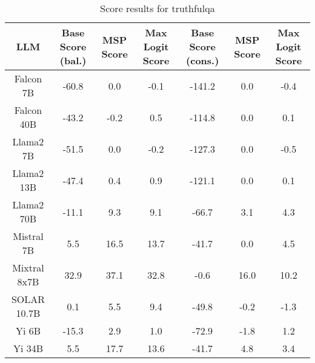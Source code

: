 \renewcommand\arraystretch{1.2}
\begin{table*}
\centering
\begin{tabular}{c|c|c|c|c|c|c}
LLM & Base Score (bal.) & MSP Score & Max Logit Score & Base Score (cons.) & MSP Score & Max Logit Score\\ \hline
Falcon 7B & -60.8 & 0.0 & -0.1 & -141.2 & 0.0 & -0.4\\
Falcon 40B & -43.2 & -0.2 & 0.5 & -114.8 & 0.0 & 0.1\\
Llama2 7B & -51.5 & 0.0 & -0.2 & -127.3 & 0.0 & -0.5\\
Llama2 13B & -47.4 & 0.4 & 0.9 & -121.1 & 0.0 & 0.1\\
Llama2 70B & -11.1 & 9.3 & 9.1 & -66.7 & 3.1 & 4.3\\
Mistral 7B & 5.5 & 16.5 & 13.7 & -41.7 & 0.0 & 4.5\\
Mixtral 8x7B & 32.9 & 37.1 & 32.8 & -0.6 & 16.0 & 10.2\\
SOLAR 10.7B & 0.1 & 5.5 & 9.4 & -49.8 & -0.2 & -1.3\\
Yi 6B & -15.3 & 2.9 & 1.0 & -72.9 & -1.8 & 1.2\\
Yi 34B & 5.5 & 17.7 & 13.6 & -41.7 & 4.8 & 3.4\\
\hline
\end{tabular}
\caption{Score results for truthfulqa}
\end{table*}
\label{tab:truthfulqa_score}
